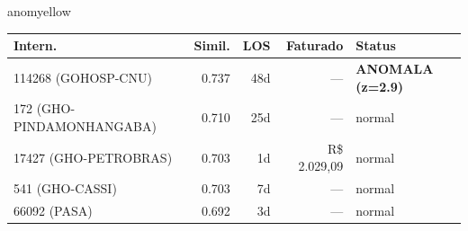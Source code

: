 \documentclass[a4paper,10pt]{article}
\begin{document}
\begin{anomalycard}[Internacao 115294 | GHO-BRADESCO | MODERADO (z=2.78)]{anomyellow}
\begin{tabular}{l r r r l}\toprule\textbf{Intern.} & \textbf{Simil.} & \textbf{LOS} & \textbf{Faturado} & \textbf{Status} \\\midrule
114268 (GOHOSP-CNU) & 0.737 & 48d & --- & \textcolor{anomred}{\textbf{ANOMALA (z=2.9)}} \\
172 (GHO-PINDAMONHANGABA) & 0.710 & 25d & --- & \textcolor{jcubeblue}{normal} \\
17427 (GHO-PETROBRAS) & 0.703 & 1d & R\$ 2.029,09 & \textcolor{jcubeblue}{normal} \\
541 (GHO-CASSI) & 0.703 & 7d & --- & \textcolor{jcubeblue}{normal} \\
66092 (PASA) & 0.692 & 3d & --- & \textcolor{jcubeblue}{normal} \\
\bottomrule\end{tabular}


\end{anomalycard}

\newpage
\end{document}
